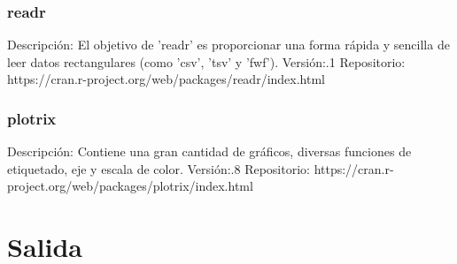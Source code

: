 \documentclass{article}
\begin{document}
\subsubsection{readr}
Descripción:\newline
El objetivo de 'readr' es proporcionar una forma rápida y sencilla de leer datos rectangulares (como 'csv', 'tsv' y 'fwf').\newline
Versión:.1\newline
Repositorio:\newline
https://cran.r-project.org/web/packages/readr/index.html

\subsubsection{plotrix}
Descripción:\newline
Contiene una gran cantidad de gráficos, diversas funciones de etiquetado, eje y escala de color.\newline
Versión:.8\newline
Repositorio:\newline
https://cran.r-project.org/web/packages/plotrix/index.html


\section{Salida}
\end{document}
